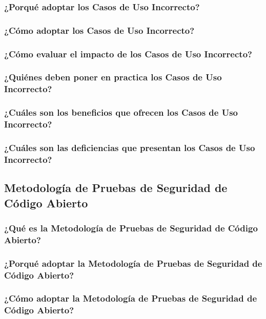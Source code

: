 \documentclass[runningheads,a4paper]{llncs}
\begin{document}
\subsubsection{¿Porqué adoptar los Casos de Uso Incorrecto?}

\subsubsection{¿Cómo adoptar los Casos de Uso Incorrecto?}

\subsubsection{¿Cómo evaluar el impacto de los Casos de Uso Incorrecto?}

\subsubsection{¿Quiénes deben poner en practica los Casos de Uso Incorrecto?}

\subsubsection{¿Cuáles son los beneficios que ofrecen los Casos de Uso Incorrecto?}

\subsubsection{¿Cuáles son las deficiencias que presentan los Casos de Uso Incorrecto?}


\subsection{Metodología de Pruebas de Seguridad de Código Abierto}

\subsubsection{¿Qué es la Metodología de Pruebas de Seguridad de Código Abierto?}

\subsubsection{¿Porqué adoptar la Metodología de Pruebas de Seguridad de Código Abierto?}

\subsubsection{¿Cómo adoptar la Metodología de Pruebas de Seguridad de Código Abierto?}
\end{document}
